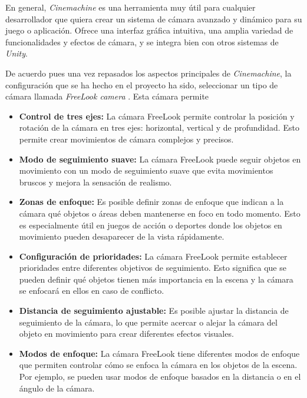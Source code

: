 En general, \textit{Cinemachine} es una herramienta muy útil para cualquier desarrollador que quiera crear un sistema de cámara avanzado y dinámico para su juego o aplicación. Ofrece una interfaz gráfica intuitiva, una amplia variedad de funcionalidades y efectos de cámara, y se integra bien con otros sistemas de \textit{Unity}.

De acuerdo pues una vez repasados los aspectos principales de \textit{Cinemachine}, la configuración que se ha hecho en el proyecto ha sido, 
seleccionar un tipo de cámara llamada \textit{FreeLook camera} \cite{CinemachineFreelook}. Esta cámara permite 
\begin{itemize}    
    \item \textbf{Control de tres ejes:} La cámara FreeLook permite controlar la posición y rotación de la cámara en tres ejes: horizontal, vertical y de profundidad. Esto permite crear movimientos de cámara complejos y precisos.
   
    \item \textbf{Modo de seguimiento suave:} La cámara FreeLook puede seguir objetos en movimiento con un modo de seguimiento suave que evita movimientos bruscos y mejora la sensación de realismo.

    \item \textbf{Zonas de enfoque:} Es posible definir zonas de enfoque que indican a la cámara qué objetos o áreas deben mantenerse en foco en todo momento. Esto es especialmente útil en juegos de acción o deportes donde los objetos en movimiento pueden desaparecer de la vista rápidamente.

    \item \textbf{Configuración de prioridades:} La cámara FreeLook permite establecer prioridades entre diferentes objetivos de seguimiento. Esto significa que se pueden definir qué objetos tienen más importancia en la escena y la cámara se enfocará en ellos en caso de conflicto.

    \item \textbf{Distancia de seguimiento ajustable:} Es posible ajustar la distancia de seguimiento de la cámara, lo que permite acercar o alejar la cámara del objeto en movimiento para crear diferentes efectos visuales.

    \item \textbf{Modos de enfoque:} La cámara FreeLook tiene diferentes modos de enfoque que permiten controlar cómo se enfoca la cámara en los objetos de la escena. Por ejemplo, se pueden usar modos de enfoque basados en la distancia o en el ángulo de la cámara.
\end{itemize}


